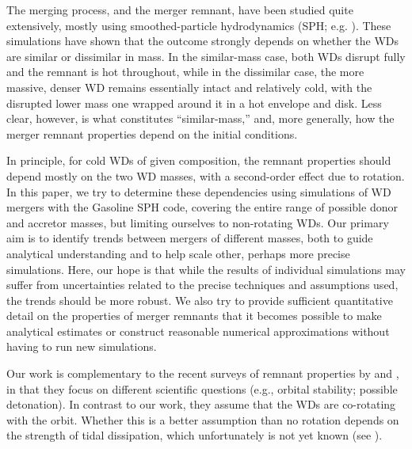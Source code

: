 The merging process, and the merger remnant, have been studied quite extensively, mostly using smoothed-particle hydrodynamics (SPH; e.g. \citealt{mona05}).  These simulations have shown that the outcome strongly depends on whether the WDs are similar or dissimilar in mass.  In the similar-mass case, both WDs disrupt fully and the remnant is hot throughout, while in the dissimilar case, the more massive, denser WD remains essentially intact and relatively cold, with the disrupted lower mass one wrapped around it in a hot envelope and disk.  Less clear, however, is what constitutes ``similar-mass,'' and, more generally, how the merger remnant properties depend on the initial conditions.  

In principle, for cold WDs of given composition, the remnant properties should depend mostly on the two WD masses, with a second-order effect due to rotation.  In this paper, we try to determine these dependencies using simulations of WD mergers with the Gasoline SPH code, covering the entire range of possible donor and accretor masses, but limiting ourselves to non-rotating WDs.  Our primary aim is to identify trends between mergers of different masses, both to guide analytical understanding and to help scale other, perhaps more precise simulations.  Here, our hope is that while the results of individual simulations may suffer from uncertainties related to the precise techniques and assumptions used, the trends should be more robust.  We also try to provide sufficient quantitative detail on the properties of merger remnants that it becomes possible to make analytical estimates or construct reasonable numerical approximations without having to run new simulations.

Our work is complementary to the recent surveys of remnant properties by \cite{rask+12} and \cite{dan+12}, in that they focus on different scientific questions (e.g., orbital stability; possible detonation).  In contrast to our work, they assume that the WDs are co-rotating with the orbit.  Whether this is a better assumption than no rotation depends on the strength of tidal dissipation, which unfortunately is not yet known (see \citealt{marsns04,fulll12}).

